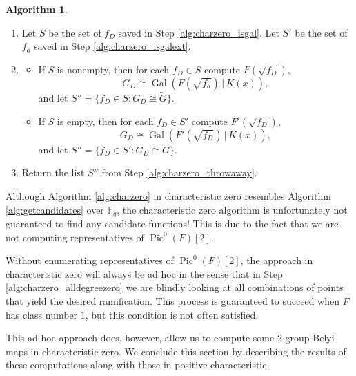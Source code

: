 \documentclass{dcthesis}
\newcommand{\wt}[1]{\widetilde{#1}}
\newcommand{\FF}{\mathbb{F}}
\DeclareMathOperator{\Pic}{Pic}
\DeclareMathOperator{\Gal}{Gal}
\numberwithin{equation}{section}
\theoremstyle{definition}
\newtheorem{alg}[equation]{Algorithm}
\theoremstyle{remark}
\begin{document}
{{{\begin{alg}
\begin{enumerate}
\begin{enumerate}
              then save $f_D$.
              Go to the next $D\in M$.
          \end{enumerate}
        \item\label{alg:charzero_overext}
          Let $S$ be the set of $f_D$
          saved in Step
          \ref{alg:charzero_isgal}.
          Let $S'$ be the set of $f_a$
          saved in Step
          \ref{alg:charzero_isgalext}.
        \item\label{alg:charzero_throwaway}
        \begin{itemize}
          \item
            If $S$ is nonempty,
            then
            for each $f_D\in S$
            compute
            $F(\sqrt{f_D})$,
            \[
              G_D\cong\Gal(F(\sqrt{f_a})\,|\,K(x)),
            \]
            and let
            $S''=
            \{f_D\in S:G_D\cong\wt{G}\}$.
          \item
            If $S$ is empty,
            then
            for each $f_D\in S'$
            compute
            $F'(\sqrt{f_D})$,
            \[
              G_D\cong\Gal(F'(\sqrt{f_D})\,|\,K(x)),
            \]
            and let
            $S''=
            \{f_D\in S':G_D\cong\wt{G}\}$.
        \end{itemize}
        \item\label{alg:charzero_return}
          Return the list $S''$ from
          Step
          \ref{alg:charzero_throwaway}.
      \end{enumerate}
    \end{alg}
    Although Algorithm
    \ref{alg:charzero}
    in characteristic zero
    resembles
    Algorithm
    \ref{alg:getcandidates} over $\FF_q$,
    the characteristic zero algorithm
    is unfortunately not guaranteed to
    find any candidate functions!
    This is due to the fact that
    we are not computing representatives
    of $\Pic^0(F)[2]$.
    \par
    Without enumerating representatives
    of $\Pic^0(F)[2]$,
    the approach in characteristic zero
    will always be ad hoc
    in the sense that in Step
    \ref{alg:charzero_alldegreezero}
    we are blindly looking at all combinations
    of points that yield the desired ramification.
    This process is guaranteed to succeed
    when $F$ has class number $1$,
    but this condition is not often satisfied.
    \par
    This ad hoc approach does, however,
    allow us to compute some $2$-group
    Belyi maps in characteristic zero.
    We conclude this section by describing
    the results of these computations
    along with those in
    positive characteristic.
  }
}}
\end{document}

